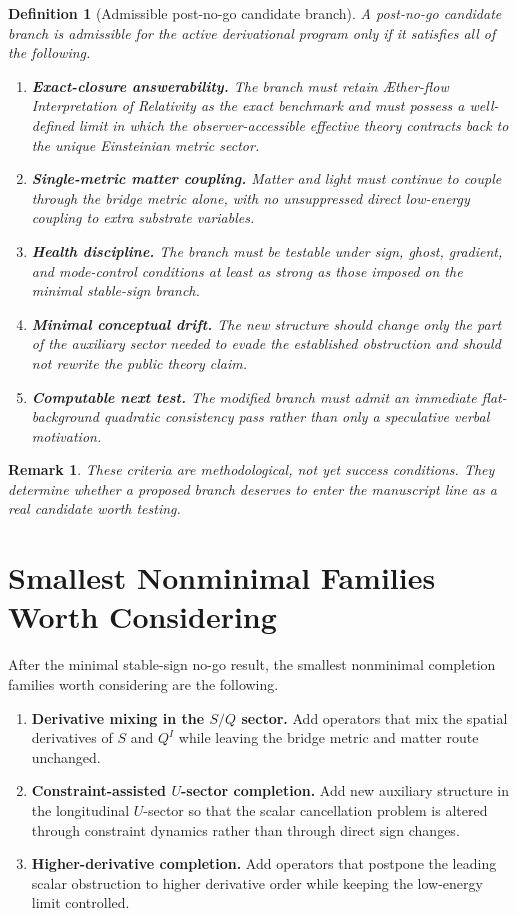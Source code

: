 \documentclass[11pt]{article}
\newcommand{\Aflow}{\AE{}ther-flow}
\newcommand{\TheoryName}{\Aflow{} Interpretation of Relativity}
\newtheorem{definition}{Definition}
\newtheorem{remark}{Remark}
\begin{document}
\begin{definition}[Admissible post-no-go candidate branch]
A post-no-go candidate branch is admissible for the active derivational program only if it satisfies all of the following.
\begin{enumerate}
    \item \textbf{Exact-closure answerability.} The branch must retain \TheoryName{} as the exact benchmark and must possess a well-defined limit in which the observer-accessible effective theory contracts back to the unique Einsteinian metric sector.
    \item \textbf{Single-metric matter coupling.} Matter and light must continue to couple through the bridge metric alone, with no unsuppressed direct low-energy coupling to extra substrate variables.
    \item \textbf{Health discipline.} The branch must be testable under sign, ghost, gradient, and mode-control conditions at least as strong as those imposed on the minimal stable-sign branch.
    \item \textbf{Minimal conceptual drift.} The new structure should change only the part of the auxiliary sector needed to evade the established obstruction and should not rewrite the public theory claim.
    \item \textbf{Computable next test.} The modified branch must admit an immediate flat-background quadratic consistency pass rather than only a speculative verbal motivation.
\end{enumerate}
\end{definition}

\begin{remark}
These criteria are methodological, not yet success conditions. They determine whether a proposed branch deserves to enter the manuscript line as a real candidate worth testing.
\end{remark}

\section{Smallest Nonminimal Families Worth Considering}

After the minimal stable-sign no-go result, the smallest nonminimal completion families worth considering are the following.
\begin{enumerate}
    \item \textbf{Derivative mixing in the \(S/Q\) sector.} Add operators that mix the spatial derivatives of \(S\) and \(Q^I\) while leaving the bridge metric and matter route unchanged.
    \item \textbf{Constraint-assisted \(U\)-sector completion.} Add new auxiliary structure in the longitudinal \(U\)-sector so that the scalar cancellation problem is altered through constraint dynamics rather than through direct sign changes.
    \item \textbf{Higher-derivative completion.} Add operators that postpone the leading scalar obstruction to higher derivative order while keeping the low-energy limit controlled.
\end{enumerate}
\end{document}
